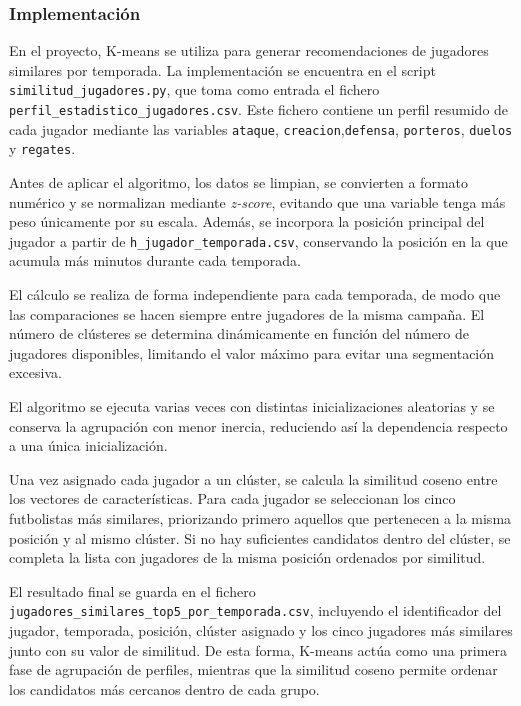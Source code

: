 \subsubsection{Implementación}

En el proyecto, K-means se utiliza para generar recomendaciones de jugadores similares por temporada. La implementación se encuentra en el script
\texttt{similitud\_jugadores.py}, que toma como entrada el fichero
\texttt{perfil\_estadistico\_jugadores.csv}. Este fichero contiene un perfil resumido de cada jugador mediante las variables \texttt{ataque}, \texttt{creacion},\texttt{defensa}, \texttt{porteros}, \texttt{duelos} y \texttt{regates}.

Antes de aplicar el algoritmo, los datos se limpian, se convierten a formato numérico y se normalizan mediante \textit{z-score}, evitando que una variable tenga más peso únicamente por su escala. Además, se incorpora la posición principal del jugador a partir de \texttt{h\_jugador\_temporada.csv}, conservando la posición en la que acumula más minutos durante cada temporada.

El cálculo se realiza de forma independiente para cada temporada, de modo que las comparaciones se hacen siempre entre jugadores de la misma campaña. El número de clústeres se determina dinámicamente en función del número de jugadores disponibles, limitando el valor máximo para evitar una segmentación excesiva.

El algoritmo se ejecuta varias veces con distintas inicializaciones aleatorias y se conserva la agrupación con menor inercia, reduciendo así la dependencia respecto a una única inicialización.

Una vez asignado cada jugador a un clúster, se calcula la similitud coseno entre los vectores de características. Para cada jugador se seleccionan los cinco futbolistas más similares, priorizando primero aquellos que pertenecen a la misma posición y al mismo clúster. Si no hay suficientes candidatos dentro del clúster, se completa la lista con jugadores de la misma posición ordenados por similitud.

El resultado final se guarda en el fichero \texttt{jugadores\_similares\_top5\_por\_temporada.csv}, incluyendo el identificador del jugador, temporada, posición, clúster asignado y los cinco jugadores más similares junto con su valor de similitud. De esta forma, K-means actúa como una primera fase de agrupación de perfiles, mientras que la similitud coseno permite ordenar los candidatos más cercanos dentro de cada grupo.

